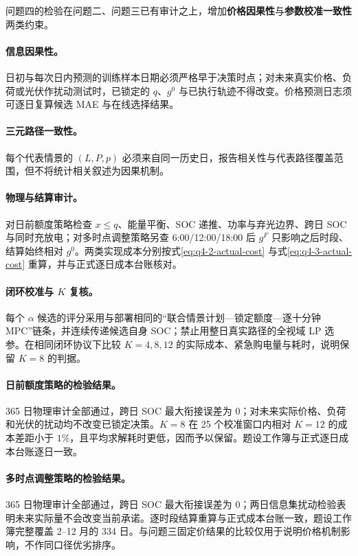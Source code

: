问题四的检验在问题二、问题三已有审计之上，增加\textbf{价格因果性}与\textbf{参数校准一致性}两类约束。

\paragraph{信息因果性。}日初与每次日内预测的训练样本日期必须严格早于决策时点；对未来真实价格、负荷或光伏作扰动测试时，已锁定的 $q$、$g^0$ 与已执行轨迹不得改变。价格预测日志须可逐日复算候选 MAE 与在线选择结果。

\paragraph{三元路径一致性。}每个代表情景的 $(L,P,p)$ 必须来自同一历史日，报告相关性与代表路径覆盖范围，但不将统计相关叙述为因果机制。

\paragraph{物理与结算审计。}对日前额度策略检查 $x\le q$、能量平衡、SOC 递推、功率与弃光边界、跨日 SOC 与同时充放电；对多时点调整策略另查 6:00/12:00/18:00 后 $g^F$ 只影响之后时段、结算始终相对 $g^0$。两类实现成本分别按式\eqref{eq:q4-2-actual-cost} 与式\eqref{eq:q4-3-actual-cost} 重算，并与正式逐日成本台账核对。

\paragraph{闭环校准与 $K$ 复核。}每个 $\alpha$ 候选的评分采用与部署相同的“联合情景计划—锁定额度—逐十分钟 MPC”链条，并连续传递候选自身 SOC；禁止用整日真实路径的全视域 LP 选参。在相同闭环协议下比较 $K=4,8,12$ 的实际成本、紧急购电量与耗时，说明保留 $K=8$ 的判据。

\paragraph{日前额度策略的检验结果。}365 日物理审计全部通过，跨日 SOC 最大衔接误差为 0；对未来实际价格、负荷和光伏的扰动均不改变已锁定决策。$K=8$ 在 25 个校准窗口内相对 $K=12$ 的成本差距小于 $1\%$，且平均求解耗时更低，因而予以保留。题设工作簿与正式逐日成本台账逐日一致。

\paragraph{多时点调整策略的检验结果。}365 日物理审计全部通过，跨日 SOC 最大衔接误差为 0；两日信息集扰动检验表明未来实际量不会改变当前承诺。逐时段结算重算与正式成本台账一致，题设工作簿完整覆盖 2--12 月的 334 日。与问题三固定价结果的比较仅用于说明价格机制影响，不作同口径优劣排序。

